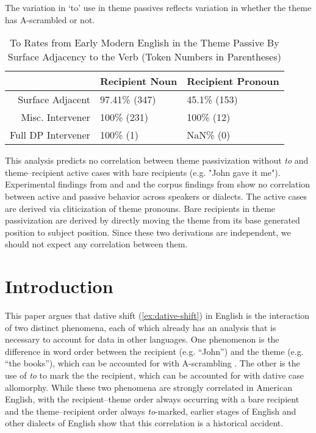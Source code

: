 The variation in `to' use in theme passives reflects variation in whether the theme has A-scrambled or not. 




\begin{table}[ht]
\centering
\begin{tabular}{rll}
  \hline
 & Recipient Noun & Recipient Pronoun \\ 
  \hline
Surface Adjacent & 97.41\% (347) & 45.1\% (153) \\ 
  Misc. Intervener & 100\% (231) & 100\% (12) \\ 
  Full DP Intervener & 100\% (1) & NaN\% (0) \\ 
   \hline
\end{tabular}
\caption{To Rates from Early Modern English in the Theme Passive By Surface Adjacency to the Verb (Token Numbers in Parentheses)} 
\end{table}



This analysis predicts no correlation between theme passivization without \emph{to} and theme--recipient active cases with bare recipients (e.g. "John gave it me"). Experimental findings from \cite{Haddican.2010} and \cite{Haddican.2011,Haddican.2012} and the corpus findings from \cite{Gerwin.2013} show no correlation between active and passive behavior across speakers or dialects. The active cases are derived via cliticization of theme pronouns. Bare recipients in theme passivization are derived by directly moving the theme from its base generated position to subject position. Since these two derivations are independent, we should not expect any correlation between them.



\section{Introduction}
This paper argues that dative shift (\ref{ex:dative-shift}) in English is the interaction of two distinct phenomena, each of which already has an analysis that is necessary to account for data in other languages. One phenomenon is the difference in word order between the recipient (e.g. ``John'') and the theme (e.g. ``the books''), which can be accounted for with A-scrambling \citep{McGinnis.1998,Takano.1998}. The other is the use of \textit{to} to mark the the recipient, which can be accounted for with dative case allomorphy. While these two phenomena are strongly correlated in American English, with the recipient--theme order always occurring with a bare recipient and the theme--recipient order always \textit{to}-marked, earlier stages of English and other dialects of English show that this correlation is a historical accident. 


